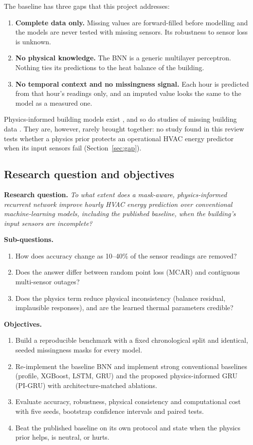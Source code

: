 The baseline has three gaps that this project addresses:
\begin{enumerate}[nosep]
\item \textbf{Complete data only.} Missing values are forward-filled before modelling and the models are never tested with missing sensors. Its robustness to sensor loss is unknown.
\item \textbf{No physical knowledge.} The BNN is a generic multilayer perceptron. Nothing ties its predictions to the heat balance of the building.
\item \textbf{No temporal context and no missingness signal.} Each hour is predicted from that hour's readings only, and an imputed value looks the same to the model as a measured one.
\end{enumerate}
Physics-informed building models exist \citep{gokhale2022pinn,dinatale2022pcnn,chen2023physcon}, and so do studies of missing building data \citep{kim2023imputation,lee2024missing,liguori2024opening}. They are, however, rarely brought together: no study found in this review tests whether a physics prior protects an operational HVAC energy predictor when its input sensors fail (Section~\ref{sec:gap}).

\subsection{Research question and objectives}
\textbf{Research question.} \emph{To what extent does a mask-aware, physics-informed recurrent network improve hourly HVAC energy prediction over conventional machine-learning models, including the published baseline, when the building's input sensors are incomplete?}

\textbf{Sub-questions.}
\begin{enumerate}[label=RQ\arabic*,nosep]
\item How does accuracy change as 10--40\% of the sensor readings are removed?
\item Does the answer differ between random point loss (MCAR) and contiguous multi-sensor outages?
\item Does the physics term reduce physical inconsistency (balance residual, implausible responses), and are the learned thermal parameters credible?
\end{enumerate}

\textbf{Objectives.}
\begin{enumerate}[label=O\arabic*,nosep]
\item Build a reproducible benchmark with a fixed chronological split and identical, seeded missingness masks for every model.
\item Re-implement the baseline BNN and implement strong conventional baselines (profile, XGBoost, LSTM, GRU) and the proposed physics-informed GRU (PI-GRU) with architecture-matched ablations.
\item Evaluate accuracy, robustness, physical consistency and computational cost with five seeds, bootstrap confidence intervals and paired tests.
\item Beat the published baseline on its own protocol and state when the physics prior helps, is neutral, or hurts.
\end{enumerate}

